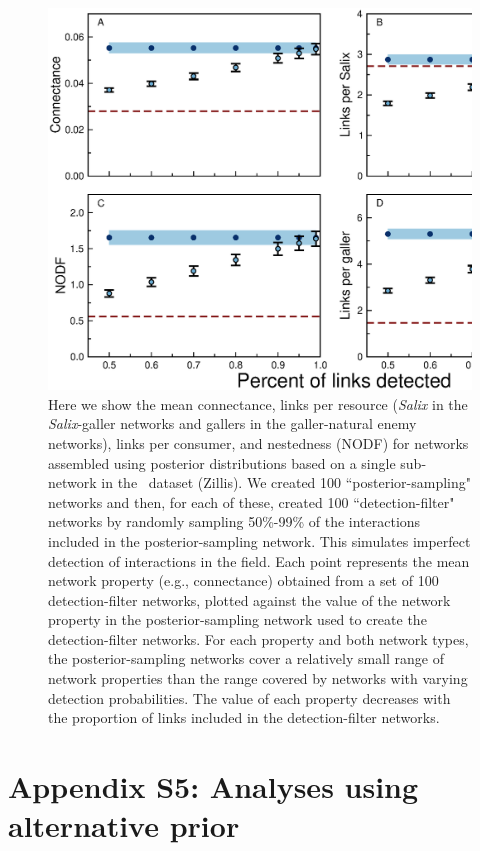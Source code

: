 \documentclass[12pt]{article}
\begin{document}
    \begin{figure}[h!]
      \caption{Here we show the mean connectance, links per resource (\emph{Salix} in the \emph{Salix}-galler networks and gallers in the galler-natural enemy networks), links per consumer, and nestedness (NODF) for networks assembled using posterior distributions based on a single sub-network in the~\citet{Kopelke2017} dataset (Zillis). We created 100 ``posterior-sampling" networks and then, for each of these, created 100 ``detection-filter" networks by randomly sampling 50\%-99\% of the interactions included in the posterior-sampling network. This simulates imperfect detection of interactions in the field. Each point represents the mean network property (e.g., connectance) obtained from a set of 100 detection-filter networks, plotted against the value of the network property in the posterior-sampling network used to create the detection-filter networks. For each property and both network types, the posterior-sampling networks cover a relatively small range of network properties than the range covered by networks with varying detection probabilities. The value of each property decreases with the proportion of links included in the detection-filter networks.}
      \label{posterior_webs}    
      \begin{center}
      \includegraphics[width=.7\textwidth]{figures/SG_posterior_properties_Zillis.eps}
      \end{center}
      \end{figure}

\clearpage

\section*{Appendix S5: Analyses using alternative prior}
\end{document}
